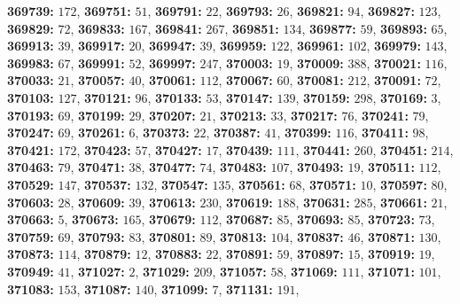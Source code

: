 \textsf{\bfseries 369739:} $172$, \textsf{\bfseries 369751:} $51$, \textsf{\bfseries 369791:} $22$, \textsf{\bfseries 369793:} $26$, \textsf{\bfseries 369821:} $94$, \textsf{\bfseries 369827:} $123$, \textsf{\bfseries 369829:} $72$, \textsf{\bfseries 369833:} $167$, \textsf{\bfseries 369841:} $267$, \textsf{\bfseries 369851:} $134$, \textsf{\bfseries 369877:} $59$, \textsf{\bfseries 369893:} $65$, \textsf{\bfseries 369913:} $39$, \textsf{\bfseries 369917:} $20$, \textsf{\bfseries 369947:} $39$, \textsf{\bfseries 369959:} $122$, \textsf{\bfseries 369961:} $102$, \textsf{\bfseries 369979:} $143$, \textsf{\bfseries 369983:} $67$, \textsf{\bfseries 369991:} $52$, \textsf{\bfseries 369997:} $247$, \textsf{\bfseries 370003:} $19$, \textsf{\bfseries 370009:} $388$, \textsf{\bfseries 370021:} $116$, \textsf{\bfseries 370033:} $21$, \textsf{\bfseries 370057:} $40$, \textsf{\bfseries 370061:} $112$, \textsf{\bfseries 370067:} $60$, \textsf{\bfseries 370081:} $212$, \textsf{\bfseries 370091:} $72$, \textsf{\bfseries 370103:} $127$, \textsf{\bfseries 370121:} $96$, \textsf{\bfseries 370133:} $53$, \textsf{\bfseries 370147:} $139$, \textsf{\bfseries 370159:} $298$, \textsf{\bfseries 370169:} $3$, \textsf{\bfseries 370193:} $69$, \textsf{\bfseries 370199:} $29$, \textsf{\bfseries 370207:} $21$, \textsf{\bfseries 370213:} $33$, \textsf{\bfseries 370217:} $76$, \textsf{\bfseries 370241:} $79$, \textsf{\bfseries 370247:} $69$, \textsf{\bfseries 370261:} $6$, \textsf{\bfseries 370373:} $22$, \textsf{\bfseries 370387:} $41$, \textsf{\bfseries 370399:} $116$, \textsf{\bfseries 370411:} $98$, \textsf{\bfseries 370421:} $172$, \textsf{\bfseries 370423:} $57$, \textsf{\bfseries 370427:} $17$, \textsf{\bfseries 370439:} $111$, \textsf{\bfseries 370441:} $260$, \textsf{\bfseries 370451:} $214$, \textsf{\bfseries 370463:} $79$, \textsf{\bfseries 370471:} $38$, \textsf{\bfseries 370477:} $74$, \textsf{\bfseries 370483:} $107$, \textsf{\bfseries 370493:} $19$, \textsf{\bfseries 370511:} $112$, \textsf{\bfseries 370529:} $147$, \textsf{\bfseries 370537:} $132$, \textsf{\bfseries 370547:} $135$, \textsf{\bfseries 370561:} $68$, \textsf{\bfseries 370571:} $10$, \textsf{\bfseries 370597:} $80$, \textsf{\bfseries 370603:} $28$, \textsf{\bfseries 370609:} $39$, \textsf{\bfseries 370613:} $230$, \textsf{\bfseries 370619:} $188$, \textsf{\bfseries 370631:} $285$, \textsf{\bfseries 370661:} $21$, \textsf{\bfseries 370663:} $5$, \textsf{\bfseries 370673:} $165$, \textsf{\bfseries 370679:} $112$, \textsf{\bfseries 370687:} $85$, \textsf{\bfseries 370693:} $85$, \textsf{\bfseries 370723:} $73$, \textsf{\bfseries 370759:} $69$, \textsf{\bfseries 370793:} $83$, \textsf{\bfseries 370801:} $89$, \textsf{\bfseries 370813:} $104$, \textsf{\bfseries 370837:} $46$, \textsf{\bfseries 370871:} $130$, \textsf{\bfseries 370873:} $114$, \textsf{\bfseries 370879:} $12$, \textsf{\bfseries 370883:} $22$, \textsf{\bfseries 370891:} $59$, \textsf{\bfseries 370897:} $15$, \textsf{\bfseries 370919:} $19$, \textsf{\bfseries 370949:} $41$, \textsf{\bfseries 371027:} $2$, \textsf{\bfseries 371029:} $209$, \textsf{\bfseries 371057:} $58$, \textsf{\bfseries 371069:} $111$, \textsf{\bfseries 371071:} $101$, \textsf{\bfseries 371083:} $153$, \textsf{\bfseries 371087:} $140$, \textsf{\bfseries 371099:} $7$, \textsf{\bfseries 371131:} $191$, 
